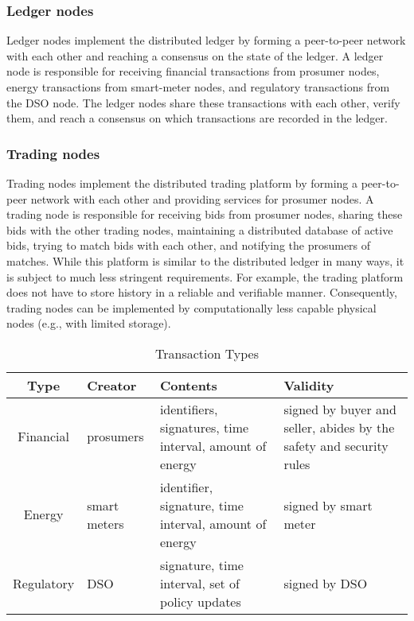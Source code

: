 \documentclass[sigconf]{acmart}
\begin{document}
\subsubsection{Ledger nodes}
Ledger nodes implement the distributed ledger by forming a peer-to-peer network with each other and reaching a consensus on the state of the ledger.
A ledger node is responsible for receiving financial transactions from prosumer nodes, energy transactions from smart-meter nodes, and regulatory transactions from the DSO node.
The ledger nodes share these transactions with each other, verify them, and reach a consensus on which transactions are recorded in the ledger. 

\subsubsection{Trading nodes}
Trading nodes implement the distributed trading platform by forming a peer-to-peer network with each other and providing services for prosumer nodes.
A trading node is responsible for receiving bids from prosumer nodes, sharing these bids with the other trading nodes, maintaining a distributed database of active bids, trying to match bids with each other, and notifying the prosumers of matches.
While this platform is similar to the distributed ledger in many ways, it is subject to much less stringent requirements.
For example, the trading platform does not have to store history in a reliable and verifiable manner.
Consequently, trading nodes can be implemented by computationally less capable physical nodes (e.g., with limited storage).

\begin{table*}
\caption{Transaction Types}
\label{tab:transactionTypes}
\begin{tabular}{|c||l|l|p{5.8cm}|}
\hline
\textbf{Type} & \textbf{Creator} & \textbf{Contents} & \textbf{Validity} \\
\hline\hline
\rowcolor{Gray} Financial  & prosumers    & identifiers, signatures, time interval, amount of energy & signed by buyer and seller, abides by the safety and security rules \\ \hline
                Energy     & smart meters & identifier, signature, time interval, amount of energy   & signed by smart meter \\ \hline
\rowcolor{Gray} Regulatory & DSO          & signature, time interval, set of policy updates            & signed by DSO \\ \hline
\end{tabular}
\end{table*}
\end{document}
